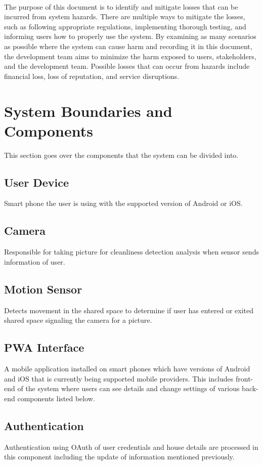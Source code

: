 \documentclass{article}
\begin{document}
\\
The purpose of this document is to identify and mitigate losses that can be incurred from system hazards. There are multiple ways to mitigate the losses, such as following appropriate regulations, implementing thorough testing, and informing users how to properly use the system. By examining as many scenarios as possible where the system can cause harm and recording it in this document, the development team aims to minimize the harm exposed to users, stakeholders, and the development team. Possible losses that can occur from hazards include financial loss, loss of reputation, and service disruptions.      

\section{System Boundaries and Components}
This section goes over the components that the system can be divided into.

\subsection{User Device}
Smart phone the user is using with the supported version of Android or iOS.

\subsection{Camera}
Responsible for taking picture for cleanliness detection analysis when sensor sends information of user.

\subsection{Motion Sensor}
Detects movement in the shared space to determine if user has entered or exited shared space signaling the camera for a picture.

\subsection{PWA Interface}
A mobile application installed on smart phones which have versions of Android and iOS that is currently being supported mobile providers. This includes front-end of the system where users can see details and change settings of various back-end components listed below.

\subsection{Authentication}
Authentication using OAuth of user credentials and house details are processed in this component including the update of information mentioned previously.
\end{document}

